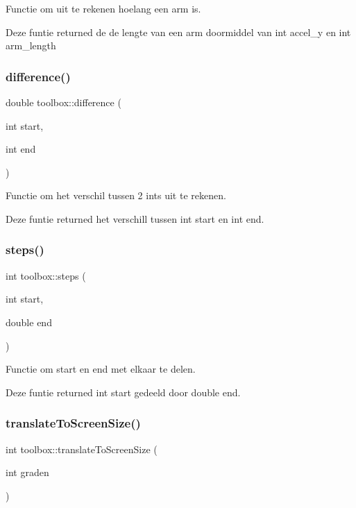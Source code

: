Functie om uit te rekenen hoelang een arm is. 

Deze funtie returned de de lengte van een arm doormiddel van int accel\+\_\+y en int arm\+\_\+length \mbox{\label{classtoolbox_a99cefed812481a44f45bd795d1c4c1f2}} 
\subsubsection{\texorpdfstring{difference()}{difference()}}
{\footnotesize\ttfamily double toolbox\+::difference (\begin{DoxyParamCaption}\item[{int}]{start,  }\item[{int}]{end }\end{DoxyParamCaption})\hspace{0.3cm}{\ttfamily [inline]}}



Functie om het verschil tussen 2 ints uit te rekenen. 

Deze funtie returned het verschill tussen int start en int end. \mbox{\label{classtoolbox_a4917b28e63e41f052b25297e4d77f2b9}} 
\subsubsection{\texorpdfstring{steps()}{steps()}}
{\footnotesize\ttfamily int toolbox\+::steps (\begin{DoxyParamCaption}\item[{int}]{start,  }\item[{double}]{end }\end{DoxyParamCaption})\hspace{0.3cm}{\ttfamily [inline]}}



Functie om start en end met elkaar te delen. 

Deze funtie returned int start gedeeld door double end. \mbox{\label{classtoolbox_a59244902aefc121a12afec6baa8e1e87}} 
\subsubsection{\texorpdfstring{translate\+To\+Screen\+Size()}{translateToScreenSize()}}
{\footnotesize\ttfamily int toolbox\+::translate\+To\+Screen\+Size (\begin{DoxyParamCaption}\item[{int}]{graden }\end{DoxyParamCaption})\hspace{0.3cm}{\ttfamily [inline]}}



